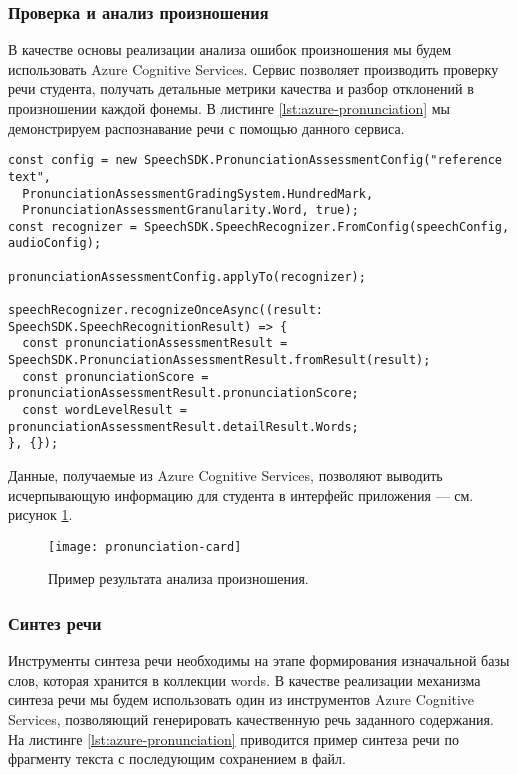 \subsubsection{Проверка и анализ произношения}
В качестве основы реализации анализа ошибок произношения мы будем использовать Azure Cognitive Services. Сервис позволяет производить проверку речи студента, получать детальные метрики качества и разбор отклонений в произношении каждой фонемы. В листинге \ref{lst:azure-pronunciation} мы демонстрируем распознавание речи с помощью данного сервиса.

\begin{lstlisting}[basicstyle=\fontsize{11}{11}\selectfont,tabsize=4,breaklines=true,caption={Пример проверки произношения с помощью Azure.},captionpos=b,label={lst:azure-pronunciation}]
const config = new SpeechSDK.PronunciationAssessmentConfig("reference text",
  PronunciationAssessmentGradingSystem.HundredMark,
  PronunciationAssessmentGranularity.Word, true);
const recognizer = SpeechSDK.SpeechRecognizer.FromConfig(speechConfig, audioConfig);

pronunciationAssessmentConfig.applyTo(recognizer);

speechRecognizer.recognizeOnceAsync((result: SpeechSDK.SpeechRecognitionResult) => {
  const pronunciationAssessmentResult = SpeechSDK.PronunciationAssessmentResult.fromResult(result);
  const pronunciationScore = pronunciationAssessmentResult.pronunciationScore;
  const wordLevelResult = pronunciationAssessmentResult.detailResult.Words;
}, {});
\end{lstlisting}

Данные, получаемые из Azure Cognitive Services, позволяют выводить исчерпывающую информацию для студента в интерфейс приложения --- см. рисунок \ref{fig:pronunciation-card}.

\begin{figure}[h]
	\centering
	\texttt{[image: pronunciation-card]}
	\caption{Пример результата анализа произношения.}
	\label{fig:pronunciation-card}
\end{figure}

\subsubsection{Синтез речи}
Инструменты синтеза речи необходимы на этапе формирования изначальной базы слов, которая хранится в коллекции words. В качестве реализации механизма синтеза речи мы будем использовать один из инструментов Azure Cognitive Services, позволяющий генерировать качественную речь заданного содержания. На листинге \ref{lst:azure-pronunciation} приводится пример синтеза речи по фрагменту текста с последующим сохранением в файл.

